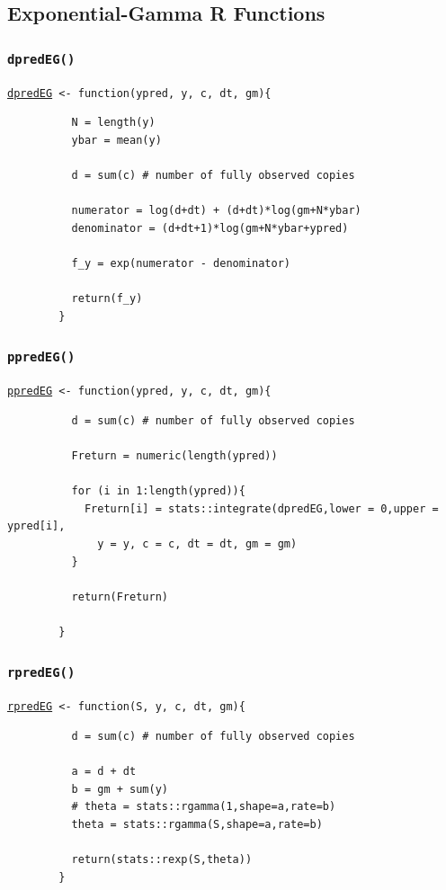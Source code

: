 \documentclass[12pt, a4paper]{article}
\begin{document}
  \subsection{Exponential-Gamma R Functions}
    \subsubsection{\texttt{dpredEG()}}\label{sec:dpredEG}

    \texttt{\hyperref[sec:EGimp]{dpredEG} <- function(ypred, y, c, dt, gm)\{ }

      \begin{verbatim}
          N = length(y)
          ybar = mean(y)

          d = sum(c) # number of fully observed copies

          numerator = log(d+dt) + (d+dt)*log(gm+N*ybar)
          denominator = (d+dt+1)*log(gm+N*ybar+ypred)

          f_y = exp(numerator - denominator)

          return(f_y)
        }
      \end{verbatim}

    \subsubsection{\texttt{ppredEG()}}\label{sec:ppredEG}

    \texttt{\hyperref[sec:EGimp]{ppredEG} <- function(ypred, y, c, dt, gm)\{ }

      \begin{verbatim}
          d = sum(c) # number of fully observed copies

          Freturn = numeric(length(ypred))

          for (i in 1:length(ypred)){
            Freturn[i] = stats::integrate(dpredEG,lower = 0,upper = ypred[i],
              y = y, c = c, dt = dt, gm = gm)
          }

          return(Freturn)

        }
      \end{verbatim}

    \subsubsection{\texttt{rpredEG()}}\label{sec:rpredEG}

    \texttt{\hyperref[sec:EGimp]{rpredEG} <- function(S, y, c, dt, gm)\{ }

      \begin{verbatim}
          d = sum(c) # number of fully observed copies

          a = d + dt
          b = gm + sum(y)
          # theta = stats::rgamma(1,shape=a,rate=b)
          theta = stats::rgamma(S,shape=a,rate=b)

          return(stats::rexp(S,theta))
        }
      \end{verbatim}
\end{document}
